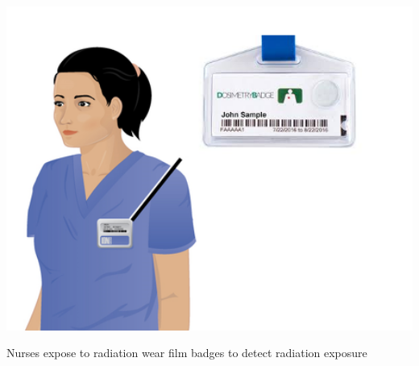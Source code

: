 \documentclass[main.tex]{subfiles}
\begin{document}
\begin{description}
\begin{marginfigure}[-11cm]%
      \includegraphics[width=1\textwidth]{../Ch-nuclear/figure5}
      \caption{Nurses expose to radiation wear film badges to detect radiation exposure}
	\end{marginfigure}%
	

\end{description}
\end{document}
